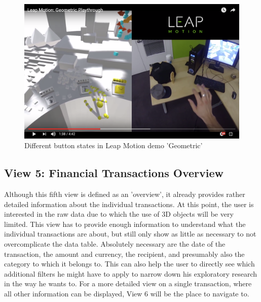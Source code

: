 \begin{figure}[t]
	\begin{center}
		\includegraphics[width=14cm]{03_Figures/07_Suggestion/LeapMotion2016_Geometric.png}
		\caption[Different button states in Leap Motion demo 'Geometric']{Different button states in Leap Motion demo 'Geometric' \citep{LeapMotion2016}}
		\label{fig:leapmotiongeometric}
	\end{center}
\end{figure}



\subsection{View 5: Financial Transactions Overview}

Although this fifth view is defined as an 'overview', it already provides rather detailed information about the individual transactions. At this point, the user is interested in the raw data due to which the use of 3D objects will be very limited. This view has to provide enough information to understand what the individual transactions are about, but still only show as little as necessary to not overcomplicate the data table. Absolutely necessary are the date of the transaction, the amount and currency, the recipient, and presumably also the category to which it belongs to. This can also help the user to directly see which additional filters he might have to apply to narrow down his exploratory research in the way he wants to. For a more detailed view on a single transaction, where all other information can be displayed, View 6 will be the place to navigate to.


